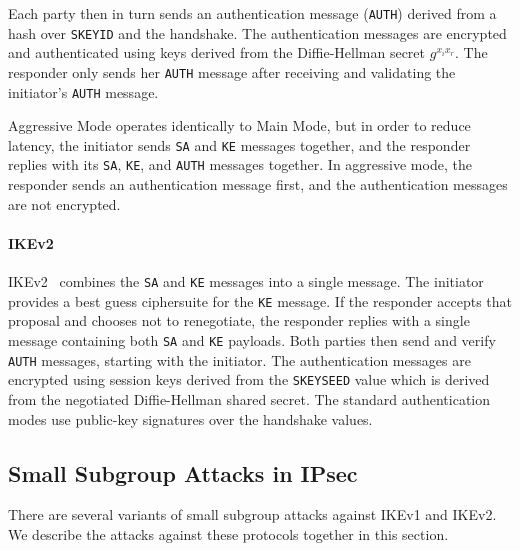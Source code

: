 Each party then in turn sends an authentication message (\texttt{AUTH}) derived
from a hash over \texttt{SKEYID} and the handshake. The authentication messages
are encrypted and authenticated using keys derived from the Diffie-Hellman
secret $g^{x_i x_r}$.  The responder only sends her \texttt{AUTH} message after
receiving and validating the initiator's \texttt{AUTH} message.

Aggressive Mode operates identically to Main Mode, but in order to reduce
latency, the initiator sends \texttt{SA} and \texttt{KE} messages together, and
the responder replies with its \texttt{SA}, \texttt{KE}, and \texttt{AUTH}
messages together. In aggressive mode, the responder sends an authentication
message first, and the authentication messages are not encrypted.


\paragraph{IKEv2}
IKEv2~\cite{rfc4306,rfc7296} combines the \texttt{SA} and \texttt{KE} messages
into a single message. The initiator provides a best guess ciphersuite for the
\texttt{KE} message. If the responder accepts that proposal and chooses not to
renegotiate, the responder replies with a single message containing both
\texttt{SA} and \texttt{KE} payloads. Both parties then send and verify
\texttt{AUTH} messages, starting with the initiator.  The authentication
messages are encrypted using session keys derived from the \texttt{SKEYSEED}
value which is derived from the negotiated Diffie-Hellman shared secret. The
standard authentication modes use public-key signatures over the handshake
values.


\subsection{Small Subgroup Attacks in IPsec} There are several variants of
small subgroup attacks against IKEv1 and IKEv2.  We describe the attacks
against these protocols together in this section.

